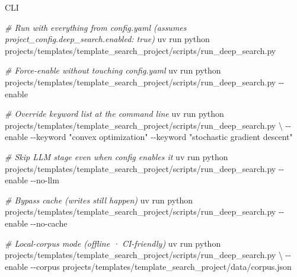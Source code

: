 \documentclass[
  ignorenonframetext,
]{beamer}
\newenvironment{Shaded}{}{}
\newcommand{\AttributeTok}[1]{\textcolor[rgb]{0.49,0.56,0.16}{#1}}
\newcommand{\CommentTok}[1]{\textcolor[rgb]{0.38,0.63,0.69}{\textit{#1}}}
\newcommand{\DataTypeTok}[1]{\textcolor[rgb]{0.56,0.13,0.00}{#1}}
\newcommand{\ExtensionTok}[1]{#1}
\newcommand{\NormalTok}[1]{#1}
\newcommand{\StringTok}[1]{\textcolor[rgb]{0.25,0.44,0.63}{#1}}
\begin{document}
\begin{frame}{CLI}
\protect{}\label{cli}
\begin{Shaded}
\begin{Highlighting}[]
\CommentTok{\# Run with everything from config.yaml (assumes project\_config.deep\_search.enabled: true)}
\ExtensionTok{uv}\NormalTok{ run python projects/templates/template\_search\_project/scripts/run\_deep\_search.py}

\CommentTok{\# Force{-}enable without touching config.yaml}
\ExtensionTok{uv}\NormalTok{ run python projects/templates/template\_search\_project/scripts/run\_deep\_search.py }\AttributeTok{{-}{-}enable}

\CommentTok{\# Override keyword list at the command line}
\ExtensionTok{uv}\NormalTok{ run python projects/templates/template\_search\_project/scripts/run\_deep\_search.py }\DataTypeTok{\textbackslash{}}
    \AttributeTok{{-}{-}enable} \AttributeTok{{-}{-}keyword} \StringTok{"convex optimization"} \AttributeTok{{-}{-}keyword} \StringTok{"stochastic gradient descent"}

\CommentTok{\# Skip LLM stage even when config enables it}
\ExtensionTok{uv}\NormalTok{ run python projects/templates/template\_search\_project/scripts/run\_deep\_search.py }\AttributeTok{{-}{-}enable} \AttributeTok{{-}{-}no{-}llm}

\CommentTok{\# Bypass cache (writes still happen)}
\ExtensionTok{uv}\NormalTok{ run python projects/templates/template\_search\_project/scripts/run\_deep\_search.py }\AttributeTok{{-}{-}enable} \AttributeTok{{-}{-}no{-}cache}

\CommentTok{\# Local{-}corpus mode (offline · CI{-}friendly)}
\ExtensionTok{uv}\NormalTok{ run python projects/templates/template\_search\_project/scripts/run\_deep\_search.py }\DataTypeTok{\textbackslash{}}
    \AttributeTok{{-}{-}enable} \AttributeTok{{-}{-}corpus}\NormalTok{ projects/templates/template\_search\_project/data/corpus.json}
\end{Highlighting}
\end{Shaded}
\end{frame}
\end{document}

